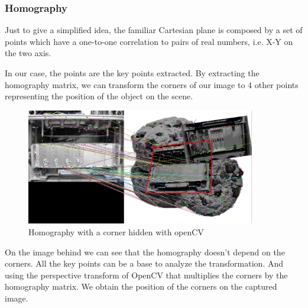 	
	\subsubsection{Homography}
	\par  Just to give a simplified idea, the familiar Cartesian plane is composed by a set of points which have a one-to-one correlation to pairs of real numbers, i.e. X-Y on the two axis\cite{Homography}.
	\par In our case, the points are the key points extracted. By extracting the homography matrix, we can transform the corners of our image to 4 other points representing the position of the object on the scene\cite{TutoHomography}.
	
	\begin{figure}
			\includegraphics[width=10cm]{images_not_compressed/showHomography.png}
			\caption{Homography with a corner hidden with openCV}
	\end{figure}
	\par On the image behind we can see that the homography doesn't depend on the corners. All the key points can be a base to analyze the transformation. And using the perspective transform of OpenCV that multiplies the corners by the homography matrix. We obtain the position of the corners on the captured image.
